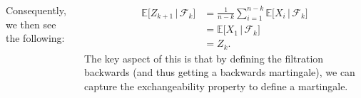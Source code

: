 \documentclass{tikzposter} %
\begin{document}
\begin{columns}
{{      Consequently, we then see the following:

      \begin{align*}
        \mathbb{E}\big[Z_{k+1} \,|\, \mathcal{F}_{k}\big] &= \frac{1}{n-k}\sum_{i=1}^{n-k}\mathbb{E}\big[X_{i} \,|\, \mathcal{F}_{k}\big] \\
                                                          &= \mathbb{E}\big[X_{1}\,|\, \mathcal{F}_{k}\big]  \\
        &= Z_{k}.
      \end{align*}
      The key aspect of this is that by defining the filtration backwards (and thus getting a backwards martingale), we can capture the exchangeability property to define a martingale.
    }

  }
\end{columns}
\end{document}
